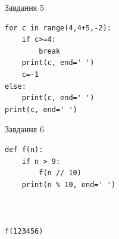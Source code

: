 \documentclass[12pt, ukrainian]{article}
\begin{document}
{\vspace{15mm}
\begin{minipage}[t]{9.7cm}                
{\begin{center}Завдання {5}\end{center}}
\begin{verbatim}
for c in range(4,4+5,-2):
    if c>=4:
        break
    print(c, end=' ')
    c=-1
else:
    print(c, end=' ')
print(c, end=' ')
\end{verbatim}     
\end{minipage}
\vline \hspace{8mm}
\begin{minipage}[t]{8.0cm}                
{\begin{center}Завдання {6}\end{center}}
\begin{verbatim}
def f(n):
    if n > 9:
        f(n // 10)
    print(n % 10, end=' ')
    


f(123456)
\end{verbatim}     
\end{minipage}

}
\newpage
\end{document}
